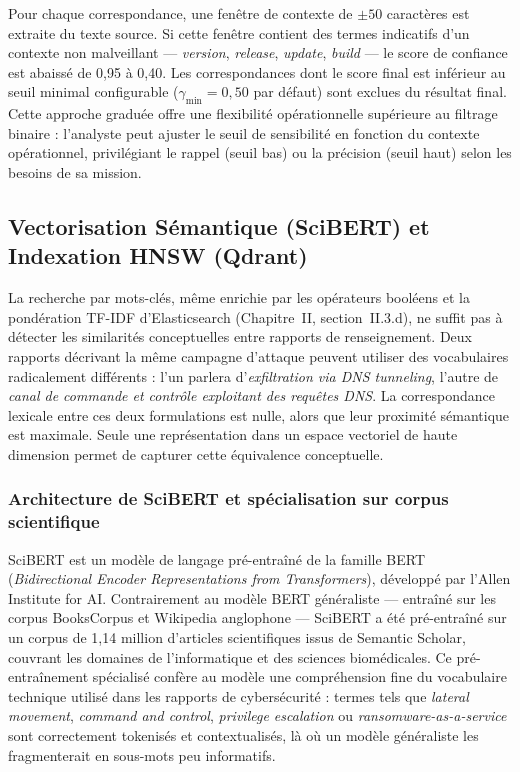 Pour chaque correspondance, une fenêtre de contexte de $\pm 50$ caractères est extraite du texte source. Si cette fenêtre contient des termes indicatifs d'un contexte non malveillant --- \textit{version}, \textit{release}, \textit{update}, \textit{build} --- le score de confiance est abaissé de 0{,}95 à 0{,}40. Les correspondances dont le score final est inférieur au seuil minimal configurable ($\gamma_{\min} = 0{,}50$ par défaut) sont exclues du résultat final. Cette approche graduée offre une flexibilité opérationnelle supérieure au filtrage binaire : l'analyste peut ajuster le seuil de sensibilité en fonction du contexte opérationnel, privilégiant le rappel (seuil bas) ou la précision (seuil haut) selon les besoins de sa mission.

\subsection{Vectorisation Sémantique (SciBERT) et Indexation HNSW (Qdrant)}

La recherche par mots-clés, même enrichie par les opérateurs booléens et la pondération TF-IDF d'Elasticsearch (Chapitre~II, section~II.3.d), ne suffit pas à détecter les similarités conceptuelles entre rapports de renseignement. Deux rapports décrivant la même campagne d'attaque peuvent utiliser des vocabulaires radicalement différents : l'un parlera d'\textit{exfiltration via DNS tunneling}, l'autre de \textit{canal de commande et contrôle exploitant des requêtes DNS}. La correspondance lexicale entre ces deux formulations est nulle, alors que leur proximité sémantique est maximale. Seule une représentation dans un espace vectoriel de haute dimension permet de capturer cette équivalence conceptuelle.

\subsubsection{Architecture de SciBERT et spécialisation sur corpus scientifique}

SciBERT est un modèle de langage pré-entraîné de la famille BERT (\textit{Bidirectional Encoder Representations from Transformers}), développé par l'Allen Institute for AI. Contrairement au modèle BERT généraliste --- entraîné sur les corpus BooksCorpus et Wikipedia anglophone --- SciBERT a été pré-entraîné sur un corpus de 1{,}14 million d'articles scientifiques issus de Semantic Scholar, couvrant les domaines de l'informatique et des sciences biomédicales. Ce pré-entraînement spécialisé confère au modèle une compréhension fine du vocabulaire technique utilisé dans les rapports de cybersécurité : termes tels que \textit{lateral movement}, \textit{command and control}, \textit{privilege escalation} ou \textit{ransomware-as-a-service} sont correctement tokenisés et contextualisés, là où un modèle généraliste les fragmenterait en sous-mots peu informatifs.

